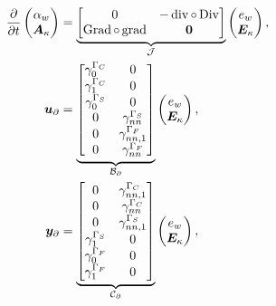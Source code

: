 \begin{equation}\label{eq:pHsysKir}
\begin{aligned}
\displaystyle
\diffp{}{t}
\begin{pmatrix}
\alpha_w \\
\bm{A}_{\kappa} \\
\end{pmatrix} &= 
\underbrace{\begin{bmatrix}
	0  &  - \div \circ \Div \\
\Grad \circ \grad & \bm{0} \\
\end{bmatrix}}_{\mathcal{J}}
\begin{pmatrix}
e_w \\
\bm{E}_{\kappa} \\
\end{pmatrix}, \vspace{3pt}\\
\bm{u}_\partial &= \underbrace{
	\begin{bmatrix}
	\gamma_{0}^{\Gamma_C} & {0}  \\
	\gamma_1^{\Gamma_C} &  {0} \\
	\gamma_{0}^{\Gamma_S} &  {0}  \\
	{0} & \gamma_{nn}^{\Gamma_S} \\
	{0} & \gamma_{nn, 1}^{\Gamma_F}  \\
	{0} & \gamma_{nn}^{\Gamma_F}\\
	\end{bmatrix}}_{\mathcal{B}_\partial} \begin{pmatrix}
e_w \\
\bm{E}_{\kappa} \\
\end{pmatrix}, \vspace{3pt}\\
\bm{y}_\partial &= \underbrace{
	\begin{bmatrix}
	{0} & \gamma_{nn, 1}^{\Gamma_C} \\
	{0} & \gamma_{nn}^{\Gamma_C} \\
	{0} & \gamma_{nn, 1}^{\Gamma_S} \\
	\gamma_{1}^{\Gamma_S} & {0} \\
	\gamma_{0}^{\Gamma_F} & {0} \\
	\gamma_{1}^{\Gamma_F} & {0} \\
	\end{bmatrix}}_{\mathcal{C}_\partial}
\begin{pmatrix}
e_w \\
\bm{E}_{\kappa} \\
\end{pmatrix},
\end{aligned}
\end{equation}
